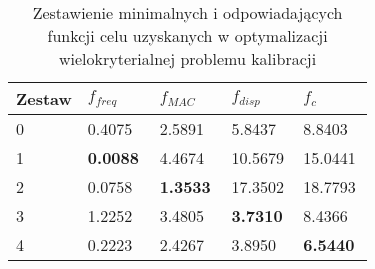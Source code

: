 \begin{table}[hbt!]
	\caption{Zestawienie minimalnych i odpowiadających funkcji celu uzyskanych w optymalizacji wielokryterialnej problemu kalibracji}
	\centering
	\footnotesize
	\setlength\tabcolsep{0pt}
	\begin{tabular}{@{}P{0.2\linewidth} *4{P{0.2\linewidth}}@{}}	
		\toprule
		Zestaw & $f_{freq}$ & $f_{MAC}$ & $f_{disp}$ & $f_{c}$ \\  & 0.4075			& 2.5891		  & 5.8437		   & 8.8403			\\ %
		1 & \textbf{0.0088} & 4.4674          & 10.5679        & 15.0441           \\ %
		2 & 0.0758          & \textbf{1.3533} & 17.3502        & 18.7793       \\ %
		3 & 1.2252          & 3.4805          & \textbf{3.7310} & 8.4366           \\ %
		4 & 0.2223          & 2.4267          & 3.8950         & \textbf{6.5440}  \\ \bottomrule
	\end{tabular}
	\label{tab:minimal_values_calibration}
\end{table}

